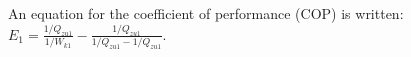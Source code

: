 An equation for the coefficient of performance (COP) is written:  
\( E_1 = \frac{1 / Q_{zu1}}{1 / W_{k1}} - \frac{1 / Q_{zu1}}{1 / Q_{zu1} - 1 / Q_{zu1}} \).